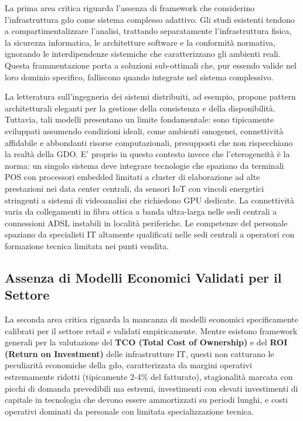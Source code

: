 La prima area critica riguarda l'assenza di framework che considerino l'infrastruttura \gls{gdo} come sistema complesso adattivo. Gli studi esistenti tendono a compartimentalizzare l'analisi, trattando separatamente l'infrastruttura fisica, la sicurezza informatica, le architetture software e la conformità normativa, ignorando le interdipendenze sistemiche che caratterizzano gli ambienti reali. Questa frammentazione porta a soluzioni sub-ottimali che, pur essendo valide nel loro dominio specifico, falliscono quando integrate nel sistema complessivo.

La letteratura sull'ingegneria dei sistemi distribuiti, ad esempio, propone pattern architetturali eleganti per la gestione della consistenza e della disponibilità. Tuttavia, tali modelli presentano un limite fondamentale: sono tipicamente sviluppati assumendo condizioni ideali, come ambienti omogenei, connettività affidabile e abbondanti risorse computazionali, presupposti che non rispecchiano la realtà della GDO. 
E' proprio in questo contesto invece che l'eterogeneità è la norma: un singolo sistema deve integrare tecnologie che spaziano da terminali POS con processori embedded limitati a cluster di elaborazione ad alte prestazioni nei data center centrali, da sensori IoT con vincoli energetici stringenti a sistemi di videoanalisi che richiedono GPU dedicate. La connettività varia da collegamenti in fibra ottica a banda ultra-larga nelle sedi centrali a connessioni ADSL instabili in località periferiche. Le competenze del personale spaziano da specialisti IT altamente qualificati nelle sedi centrali a operatori con formazione tecnica limitata nei punti vendita.

\subsection{\texorpdfstring{\textbf{Assenza di Modelli Economici Validati per il Settore}}{1.2.2 - Assenza di Modelli Economici Validati per il Settore}}

La seconda area critica riguarda la mancanza di modelli economici specificamente calibrati per il settore retail e validati empiricamente. Mentre esistono framework generali per la valutazione del \textbf{TCO (Total Cost of Ownership)} e del \textbf{ROI (Return on Investment) }delle infrastrutture IT, questi non catturano le peculiarità economiche della \gls{gdo}, caratterizzata da margini operativi estremamente ridotti (tipicamente 2-4\% del fatturato), stagionalità marcata con picchi di domanda prevedibili ma estremi, investimenti con elevati investimenti di capitale in tecnologia che devono essere ammortizzati su periodi lunghi, e costi operativi dominati da personale con limitata specializzazione tecnica.

